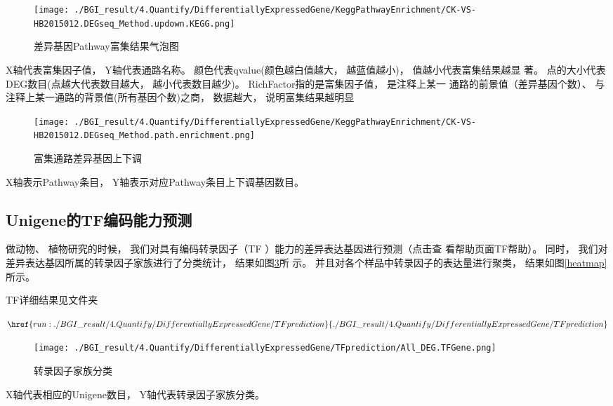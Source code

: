 \documentclass[10pt, oneside,a4paper]{article}
\begin{document}
\begin{figure}[H]
\centering
\texttt{[image: ./BGI\_result/4.Quantify/DifferentiallyExpressedGene/KeggPathwayEnrichment/CK-VS-HB2015012.DEGseq\_Method.updown.KEGG.png]}
\par
\renewcommand{\figurename}{图}
\caption{差异基因Pathway富集结果气泡图}
\label{keggup}
\end{figure}
\begin{center}
X轴代表富集因子值， Y轴代表通路名称。 颜色代表qvalue(颜色越白值越大， 越蓝值越小)， 值越小代表富集结果越显
著。 点的大小代表DEG数目(点越大代表数目越大， 越小代表数目越少)。 RichFactor指的是富集因子值， 是注释上某一
通路的前景值（差异基因个数）、 与注释上某一通路的背景值(所有基因个数)之商， 数据越大， 说明富集结果越明显
\end{center}

\begin{figure}[H]
\centering
\texttt{[image: ./BGI\_result/4.Quantify/DifferentiallyExpressedGene/KeggPathwayEnrichment/CK-VS-HB2015012.DEGseq\_Method.path.enrichment.png]}
\par
\renewcommand{\figurename}{图}
\caption{富集通路差异基因上下调}
\label{keggenrich}
\end{figure}
\begin{center}
X轴表示Pathway条目， Y轴表示对应Pathway条目上下调基因数目。
\end{center}


\subsection{Unigene的TF编码能力预测}
做动物、 植物研究的时候， 我们对具有编码转录因子（TF ）能力的差异表达基因进行预测（点击查
看帮助页面TF帮助）。 同时， 我们对差异表达基因所属的转录因子家族进行了分类统计， 结果如图\ref{tf}所
示。 并且对各个样品中转录因子的表达量进行聚类， 结果如图\ref{heatmap}所示。\par
TF详细结果见文件夹\par
$\href{run:./BGI\_result/4.Quantify/DifferentiallyExpressedGene/TFprediction}{./BGI\_result/4.Quantify/DifferentiallyExpressedGene/TFprediction}$\par
\begin{figure}[H]
\centering
\texttt{[image: ./BGI\_result/4.Quantify/DifferentiallyExpressedGene/TFprediction/All\_DEG.TFGene.png]}
\par
\renewcommand{\figurename}{图}
\caption{转录因子家族分类}
\label{tf}
\end{figure}
\begin{center}
X轴代表相应的Unigene数目， Y轴代表转录因子家族分类。
\end{center}
\end{document}
